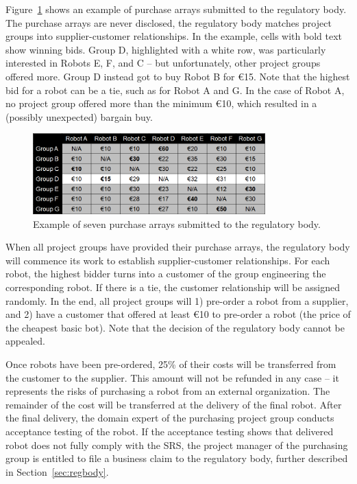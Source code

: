 \documentclass{scrreprt}
\begin{document}
Figure~\ref{fig:array} shows an example of purchase arrays submitted to the regulatory body. The purchase arrays are never disclosed, the regulatory body matches project groups into supplier-customer relationships. In the example, cells with bold text show winning bids. Group D, highlighted with a white row, was particularly interested in Robots E, F, and C -- but unfortunately, other project groups offered more. Group D instead got to buy Robot B for \euro 15. Note that the highest bid for a robot can be a tie, such as for Robot A and G. In the case of Robot A, no project group offered more than the minimum \euro 10, which resulted in a (possibly unexpected) bargain buy. 

\begin{figure}
\centering
\includegraphics[width=0.80\textwidth]{figures/purchaseArray.png}
\caption{Example of seven purchase arrays submitted to the regulatory body.}
\label{fig:array}
\end{figure}

When all project groups have provided their purchase arrays, the regulatory body will commence its work to establish supplier-customer relationships. For each robot, the highest bidder turns into a customer of the group engineering the corresponding robot. If there is a tie, the customer relationship will be assigned randomly. In the end, all project groups will 1) pre-order a robot from a supplier, and 2) have a customer that offered at least \euro 10 to pre-order a robot (the price of the cheapest basic bot). Note that the decision of the regulatory body cannot be appealed. 

Once robots have been pre-ordered, 25\% of their costs will be transferred from the customer to the supplier. This amount will not be refunded in any case -- it represents the risks of purchasing a robot from an external organization. The remainder of the cost will be transferred at the delivery of the final robot. After the final delivery, the domain expert of the purchasing project group conducts acceptance testing of the robot. If the acceptance testing shows that delivered robot does not fully comply with the SRS, the project manager of the purchasing group is entitled to file a business claim to the regulatory body, further described in Section~\ref{sec:regbody}.
\end{document}
